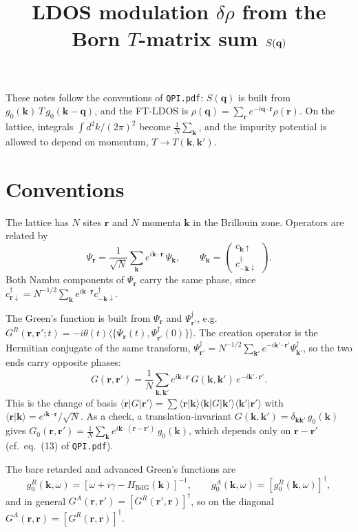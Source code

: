 \documentclass[11pt]{article}
\title{LDOS modulation $\delta\rho$ from the Born $T$-matrix sum $S(\bq)$}
\date{}
\newcommand{\bk}{\mathbf{k}}
\newcommand{\bq}{\mathbf{q}}
\newcommand{\br}{\mathbf{r}}
\newcommand{\GR}{G^{R}}
\newcommand{\GA}{G^{A}}
\begin{document}
\maketitle

These notes follow the conventions of \texttt{QPI.pdf}: $S(\bq)$ is built from $g_0(\bk)\,T\,g_0(\bk-\bq)$, and the FT-LDOS is $\rho(\bq) = \sum_{\br} e^{-i\bq\cdot\br}\rho(\br)$. On the lattice, integrals $\int d^2k/(2\pi)^2$ become $\frac{1}{N}\sum_{\bk}$, and the impurity potential is allowed to depend on momentum, $T \to T(\bk,\bk')$.

\section{Conventions}

The lattice has $N$ sites $\br$ and $N$ momenta $\bk$ in the Brillouin zone. Operators are related by
\begin{equation}
  \Psi_{\br} = \frac{1}{\sqrt{N}} \sum_{\bk} e^{i\bk\cdot\br}\, \Psi_{\bk},
  \qquad
  \Psi_{\bk} = \begin{pmatrix} c_{\bk\uparrow} \\ c^{\dagger}_{-\bk\downarrow} \end{pmatrix}.
\end{equation}
Both Nambu components of $\Psi_{\br}$ carry the same phase, since $c^{\dagger}_{\br\downarrow} = N^{-1/2}\sum_{\bk} e^{i\bk\cdot\br} c^{\dagger}_{-\bk\downarrow}$.

The Green's function is built from $\Psi_{\br}$ and $\Psi^{\dagger}_{\br'}$, e.g.\ $\GR(\br,\br';t) = -i\theta(t)\langle\{\Psi_{\br}(t), \Psi^{\dagger}_{\br'}(0)\}\rangle$. The creation operator is the Hermitian conjugate of the same transform, $\Psi^{\dagger}_{\br'} = N^{-1/2}\sum_{\bk'} e^{-i\bk'\cdot\br'}\Psi^{\dagger}_{\bk'}$, so the two ends carry opposite phases:
\begin{equation}
  G(\br,\br') = \frac{1}{N}\sum_{\bk,\bk'} e^{i\bk\cdot\br}\, G(\bk,\bk')\, e^{-i\bk'\cdot\br'} .
  \label{eq:G_rr}
\end{equation}
This is the change of basis $\langle\br|G|\br'\rangle = \sum \langle\br|\bk\rangle\langle\bk|G|\bk'\rangle\langle\bk'|\br'\rangle$ with $\langle\br|\bk\rangle = e^{i\bk\cdot\br}/\sqrt{N}$. As a check, a translation-invariant $G(\bk,\bk') = \delta_{\bk\bk'}\,g_0(\bk)$ gives $G_0(\br,\br') = \frac{1}{N}\sum_{\bk} e^{i\bk\cdot(\br-\br')}\,g_0(\bk)$, which depends only on $\br-\br'$ (cf.\ eq.~(13) of \texttt{QPI.pdf}).

The bare retarded and advanced Green's functions are
\begin{equation}
  g^R_0(\bk,\omega) = \left[\omega + i\gamma - H_{\mathrm{BdG}}(\bk)\right]^{-1},
  \qquad
  g^A_0(\bk,\omega) = \left[g^R_0(\bk,\omega)\right]^{\dagger},
\end{equation}
and in general $\GA(\br,\br') = [\GR(\br',\br)]^{\dagger}$, so on the diagonal $\GA(\br,\br) = [\GR(\br,\br)]^{\dagger}$.
\end{document}
